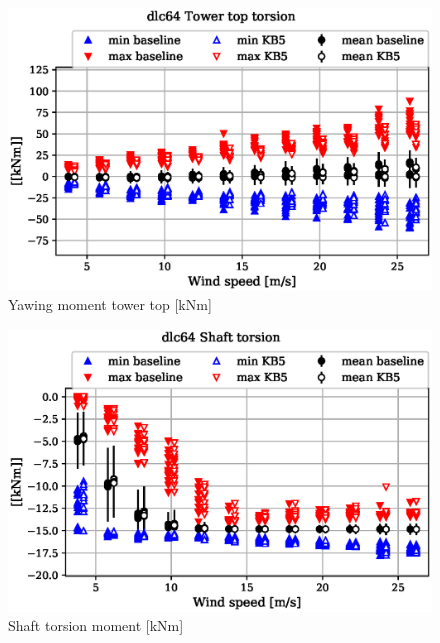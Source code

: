 \begin{figure}[!ht]
\begin{center}
	\includegraphics[width=.85\linewidth]{figures/baseline-vs-KB6/dlc64/tower-tower-node-004-momentvec-z_AA0007_AA0003.eps}
\end{center}
\caption{Yawing moment tower top [kNm]}
\label{fig:baseline-vs-KB6:dlc64:tower-top-yaw}
\end{figure}

\begin{figure}[!ht]
\begin{center}
	\includegraphics[width=.85\linewidth]{figures/baseline-vs-KB6/dlc64/shaft-shaft-node-001-momentvec-z_AA0007_AA0003.eps}
\end{center}
\caption{Shaft torsion moment [kNm]}
\label{fig:baseline-vs-KB6:dlc64:shaft-torsion}
\end{figure}

